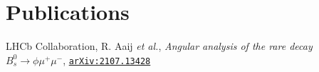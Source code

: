 \section*{Publications}
\begin{cvcontent}
  \begin{enumerate}[topsep=0pt, label={[\arabic*]}]
    \sloppy
    \item LHCb Collaboration, R. Aaij \emph{et al.}, \emph{Angular analysis of the rare decay $B_s^0 \to \phi \mu^+ \mu^-$}, \href{https://arxiv.org/abs/2107.13428}{\texttt{arXiv:2107.13428}}
  \end{enumerate}
\end{cvcontent}